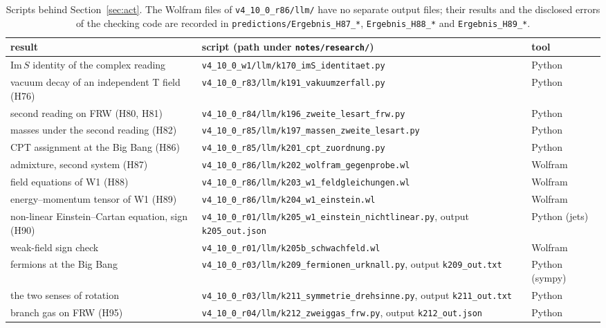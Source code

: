 \begin{table}[ht]
\centering
\footnotesize
\begin{tabularx}{\textwidth}{@{}>{\raggedright\arraybackslash}p{}>{\raggedright\arraybackslash}X l@{}}
\toprule
result & script (path under \nolinkurl{notes/research/}) & tool\\
\midrule
$\mathrm{Im}\,S$ identity of the complex reading & \nolinkurl{v4_10_0_w1/llm/k170_imS_identitaet.py} & Python\\
vacuum decay of an independent T field (H76) & \nolinkurl{v4_10_0_r83/llm/k191_vakuumzerfall.py} & Python\\
second reading on FRW (H80, H81) & \nolinkurl{v4_10_0_r84/llm/k196_zweite_lesart_frw.py} & Python\\
masses under the second reading (H82) & \nolinkurl{v4_10_0_r85/llm/k197_massen_zweite_lesart.py} & Python\\
CPT assignment at the Big Bang (H86) & \nolinkurl{v4_10_0_r85/llm/k201_cpt_zuordnung.py} & Python\\
admixture, second system (H87) & \nolinkurl{v4_10_0_r86/llm/k202_wolfram_gegenprobe.wl} & Wolfram\\
field equations of W1 (H88) & \nolinkurl{v4_10_0_r86/llm/k203_w1_feldgleichungen.wl} & Wolfram\\
energy--momentum tensor of W1 (H89) & \nolinkurl{v4_10_0_r86/llm/k204_w1_einstein.wl} & Wolfram\\
non-linear Einstein--Cartan equation, sign (H90) & \nolinkurl{v4_10_0_r01/llm/k205_w1_einstein_nichtlinear.py},
  output \nolinkurl{k205_out.json} & Python (jets)\\
weak-field sign check & \nolinkurl{v4_10_0_r01/llm/k205b_schwachfeld.wl} & Wolfram\\
fermions at the Big Bang & \nolinkurl{v4_10_0_r03/llm/k209_fermionen_urknall.py}, output \nolinkurl{k209_out.txt} & Python (sympy)\\
the two senses of rotation & \nolinkurl{v4_10_0_r03/llm/k211_symmetrie_drehsinne.py}, output \nolinkurl{k211_out.txt} & Python\\
branch gas on FRW (H95) & \nolinkurl{v4_10_0_r04/llm/k212_zweiggas_frw.py}, output \nolinkurl{k212_out.json} & Python\\
\bottomrule
\end{tabularx}
\caption{Scripts behind Section~\ref{sec:act}. The Wolfram files of \texttt{v4\_10\_0\_r86/\allowbreak llm/\allowbreak } have no separate output
files; their results and the disclosed errors of the checking code are recorded in
\texttt{predictions/\allowbreak Ergebnis\_H87\_*}, \texttt{Ergebnis\_H88\_*} and \texttt{Ergebnis\_H89\_*}.}
\label{tab:repro-act}
\end{table}

